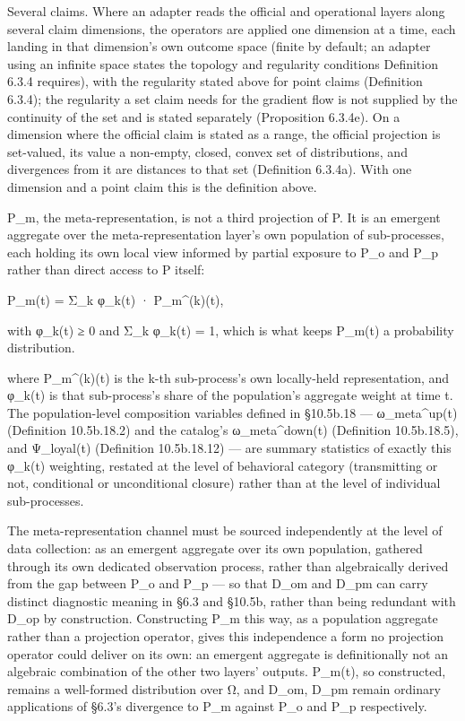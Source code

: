 \documentclass[
]{article}
\begin{document}
Several claims. Where an adapter reads the official and operational
layers along several claim dimensions, the operators are applied one
dimension at a time, each landing in that dimension's own outcome space
(finite by default; an adapter using an infinite space states the
topology and regularity conditions Definition 6.3.4 requires), with the
regularity stated above for point claims (Definition 6.3.4); the
regularity a set claim needs for the gradient flow is not supplied by
the continuity of the set and is stated separately (Proposition 6.3.4e).
On a dimension where the official claim is stated as a range, the
official projection is set-valued, its value a non-empty, closed, convex
set of distributions, and divergences from it are distances to that set
(Definition 6.3.4a). With one dimension and a point claim this is the
definition above.

P\_m, the meta-representation, is not a third projection of P. It is an
emergent aggregate over the meta-representation layer's own population
of sub-processes, each holding its own local view informed by partial
exposure to P\_o and P\_p rather than direct access to P itself:

P\_m(t) = Σ\_k φ\_k(t) · P\_m\^{}(k)(t),

with φ\_k(t) ≥ 0 and Σ\_k φ\_k(t) = 1, which is what keeps P\_m(t) a
probability distribution.

where P\_m\^{}(k)(t) is the k-th sub-process's own locally-held
representation, and φ\_k(t) is that sub-process's share of the
population's aggregate weight at time t. The population-level
composition variables defined in §10.5b.18 --- ω\_meta\^{}up(t)
(Definition 10.5b.18.2) and the catalog's ω\_meta\^{}down(t) (Definition
10.5b.18.5), and Ψ\_loyal(t) (Definition 10.5b.18.12) --- are summary
statistics of exactly this φ\_k(t) weighting, restated at the level of
behavioral category (transmitting or not, conditional or unconditional
closure) rather than at the level of individual sub-processes.

The meta-representation channel must be sourced independently at the
level of data collection: as an emergent aggregate over its own
population, gathered through its own dedicated observation process,
rather than algebraically derived from the gap between P\_o and P\_p ---
so that D\_om and D\_pm can carry distinct diagnostic meaning in §6.3
and §10.5b, rather than being redundant with D\_op by construction.
Constructing P\_m this way, as a population aggregate rather than a
projection operator, gives this independence a form no projection
operator could deliver on its own: an emergent aggregate is
definitionally not an algebraic combination of the other two layers'
outputs. P\_m(t), so constructed, remains a well-formed distribution
over Ω, and D\_om, D\_pm remain ordinary applications of §6.3's
divergence to P\_m against P\_o and P\_p respectively.
\end{document}
